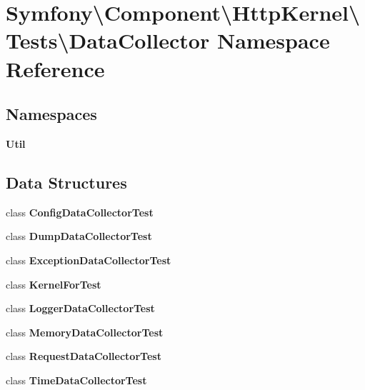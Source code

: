 \section{Symfony\textbackslash{}Component\textbackslash{}Http\+Kernel\textbackslash{}Tests\textbackslash{}Data\+Collector Namespace Reference}
\label{namespace_symfony_1_1_component_1_1_http_kernel_1_1_tests_1_1_data_collector}
\subsection*{Namespaces}
\begin{DoxyCompactItemize}
\item 
 {\bf Util}
\end{DoxyCompactItemize}
\subsection*{Data Structures}
\begin{DoxyCompactItemize}
\item 
class {\bf Config\+Data\+Collector\+Test}
\item 
class {\bf Dump\+Data\+Collector\+Test}
\item 
class {\bf Exception\+Data\+Collector\+Test}
\item 
class {\bf Kernel\+For\+Test}
\item 
class {\bf Logger\+Data\+Collector\+Test}
\item 
class {\bf Memory\+Data\+Collector\+Test}
\item 
class {\bf Request\+Data\+Collector\+Test}
\item 
class {\bf Time\+Data\+Collector\+Test}
\end{DoxyCompactItemize}
